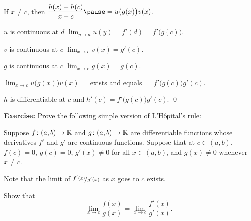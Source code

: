 \documentclass[10pt,aspectratio=169]{beamer}
\begin{document}
\begin{frame}
If $x \not= c$, then
\qquad
$\displaystyle \frac{h(x)-h(c)}{x-c}
\pause
=
u\bigl( g(x) \bigr) v(x)$.

\pause
\medskip

$u$ is continuous at $d$
\wthus
$\displaystyle \lim_{y \to d} u(y) = f'(d) = f'\bigl(g(c)\bigr)$.

\pause
\medskip

$v$ is continuous at $c$
\wthus
$\displaystyle \lim_{x \to c} v(x) = g'(c)$.

\pause
\medskip

$g$ is continuous at $c$
\wthus
$\displaystyle \lim_{x \to c} g(x) = g(c)$.

\pause
\medskip

\thus \quad
$\displaystyle\lim_{x\to c} u\bigl( g(x) \bigr) v(x)$ ~~ exists
\pause
and equals ~~
$f'\bigl(g(c)\bigr) g'(c)$.

\pause
\medskip

\thus \quad $h$ is differentiable at $c$
\pause
and $h'(c) = f'\bigl(g(c)\bigr)g'(c)$.
\qed

\end{frame}

\begin{frame}

\textbf{Exercise:}
Prove the following simple version of L'H\^opital's rule:

\pause
Suppose 
$f \colon (a,b) \to {\mathbb{R}}$ and $g \colon (a,b) \to {\mathbb{R}}$ are differentiable
functions
whose derivatives $f'$ and $g'$ are continuous functions.
\pause
Suppose that at $c \in (a,b)$, $f(c) = 0$, $g(c)=0$,
$g'(x) \not= 0$ for all $x \in (a,b)$, and
$g(x) \not= 0$ whenever $x \not= c$.

\pause
\medskip

Note
that the limit of $\nicefrac{f'(x)}{g'(x)}$ as $x$ goes to $c$ exists.

\pause
\medskip

Show that
\begin{equation*}
\lim_{x \to c} \frac{f(x)}{g(x)} = 
\lim_{x \to c} \frac{f'(x)}{g'(x)} .
\end{equation*}
\end{frame}
\end{document}
